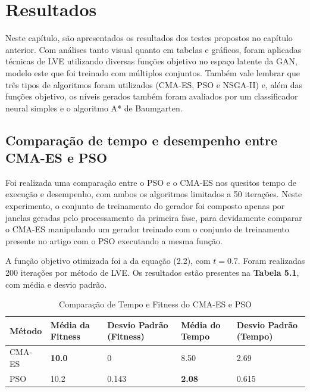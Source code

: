 \chapter{Resultados}

Neste capítulo, são apresentados os resultados dos testes propostos no capítulo anterior. Com análises tanto visual quanto em tabelas e gráficos, foram aplicadas técnicas de LVE utilizando diversas funções objetivo no espaço latente da GAN, modelo este que foi treinado com múltiplos conjuntos. Também vale lembrar que três tipos de algoritmos foram utilizados (CMA-ES, PSO e NSGA-II) e, além das funções objetivo, os níveis gerados também foram avaliados por um classificador neural simples e o algoritmo A* de Baumgarten.

\section{Comparação de tempo e desempenho entre CMA-ES e PSO}

Foi realizada uma comparação entre o PSO e o CMA-ES nos quesitos tempo de execução e desempenho, com ambos os algoritmos limitados a 50 iterações. Neste experimento, o conjunto de treinamento do gerador foi composto apenas por janelas geradas pelo processamento da primeira fase, para devidamente comparar o CMA-ES manipulando um gerador treinado com o conjunto de treinamento presente no artigo com o PSO executando a mesma função. 

A função objetivo otimizada foi a da equação (2.2), com $t = 0.7$. Foram realizadas 200 iterações por método de LVE. Os resultados estão presentes na \textbf{Tabela 5.1}, com média e desvio padrão.

\begin{table}[h]
    \centering
    \begin{tabular}{|p{2cm}|p{2cm}|p{2cm}|p{2cm}|p{2cm}|}
        \hline
        \textbf{Método} & \textbf{Média da Fitness} & \textbf{Desvio Padrão (Fitness)} & \textbf{Média do Tempo} & \textbf{Desvio Padrão (Tempo)} \\
        \hline
	  CMA-ES & \textbf{10.0} & 0 & 8.50 & 2.69 \\
        PSO & 10.2 & 0.143 & \textbf{2.08} & 0.615 \\
        \hline
    \end{tabular}
	\caption{Comparação de Tempo e Fitness do CMA-ES e PSO}
    \label{tab:metodos}
\end{table}

